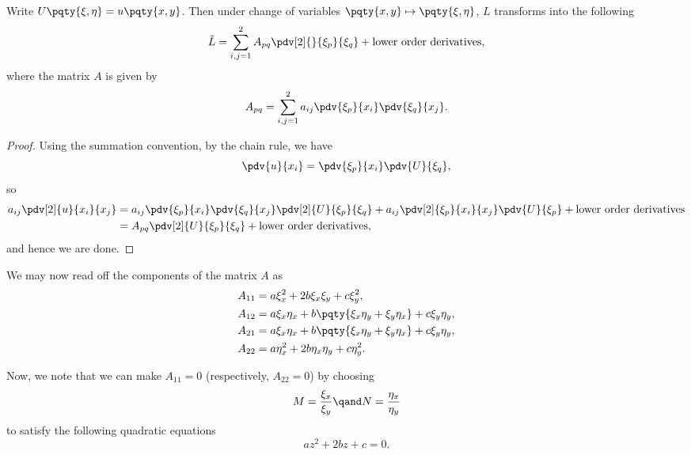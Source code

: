 \begin{proposition}
    Write \(U\pqty{\xi, \eta} = u\pqty{x, y}\). Then under change of variables \(\pqty{x, y} \mapsto \pqty{\xi, \eta}\), \(L\) transforms into the following
    \begin{equation}
        \tilde{L} = \sum_{i, j = 1}^2 A_{pq} \pdv[2]{}{\xi_p}{\xi_q} + \text{lower order derivatives},
    \end{equation}
    where the matrix \(A\) is given by
    \begin{equation}
        A_{pq} = \sum_{i, j = 1}^{2} a_{ij} \pdv{\xi_p}{x_i} \pdv{\xi_q}{x_j}.
    \end{equation}
\end{proposition}

\begin{proof}
    Using the summation convention, by the chain rule, we have
    \begin{equation}
        \pdv{u}{x_i} = \pdv{\xi_p}{x_i} \pdv{U}{\xi_q},
    \end{equation}
    so
    \begin{subequations}
        \begin{align}
            a_{ij} \pdv[2]{u}{x_i}{x_j} &= a_{ij} \pdv{\xi_p}{x_i} \pdv{\xi_q}{x_j} \pdv[2]{U}{\xi_p}{\xi_q} + a_{ij} \pdv[2]{\xi_p}{x_i}{x_j} \pdv{U}{\xi_p} + \text{lower order derivatives} \\
            &= A_{pq} \pdv[2]{U}{\xi_p}{\xi_q} + \text{lower order derivatives},
        \end{align}
    \end{subequations}
    and hence we are done.
\end{proof}

We may now read off the components of the matrix \(A\) as
\begin{subequations}
    \begin{align}
        A_{11} &= a \xi_x^2 + 2 b \xi_x \xi_y + c \xi_y^2, \\
        A_{12} &= a \xi_x \eta_x + b \pqty{\xi_x \eta_y + \xi_y \eta_x} + c \xi_y \eta_y, \\
        A_{21} &= a \xi_x \eta_x + b \pqty{\xi_x \eta_y + \xi_y \eta_x} + c \xi_y \eta_y, \\
        A_{22} &= a \eta_x^2 + 2 b \eta_x \eta_y + c \eta_y^2.
    \end{align}
\end{subequations}

Now, we note that we can make \(A_{11} = 0\) (respectively, \(A_{22} = 0\)) by choosing
\begin{equation}
    M = \frac{\xi_x}{\xi_y} \qand N = \frac{\eta_x}{\eta_y}
\end{equation}
to satisfy the following quadratic equations
\begin{equation}
    a z^2 + 2 b z + c = 0.
\end{equation}

